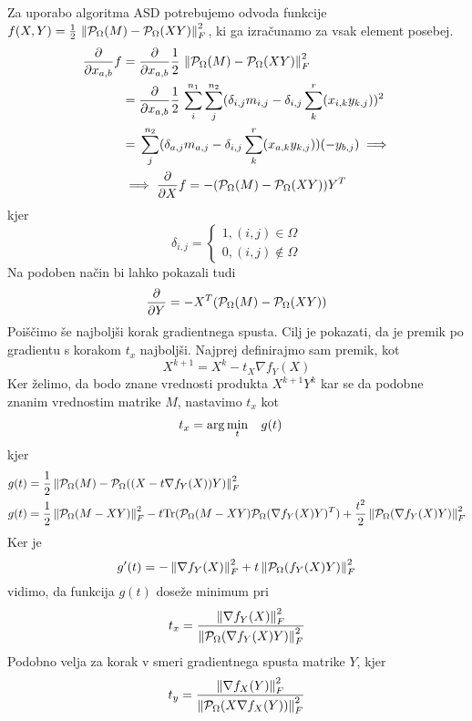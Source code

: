 Za uporabo algoritma ASD potrebujemo odvoda funkcije $f(X,Y) = \frac{1}{2}\, \left\lVert\mathcal{P}_\Omega(M) - \mathcal{P}_\Omega(XY)\right\rVert_F^2$, ki ga izračunamo za vsak element posebej.
\begin{align*}
    \frac{\partial}{\partial x_{a,b}} f &= \frac{\partial}{\partial x_{a,b}} \frac{1}{2}\, \left\lVert\mathcal{P}_\Omega(M) - \mathcal{P}_\Omega(XY)\right\rVert_F^2  \\
    &= \frac{\partial}{\partial x_{a,b}} \frac{1}{2}\, \sum_{i}^{n_1}\sum_{j}^{n_2}(\delta_{i,j}m_{i,j} - \delta_{i,j}\sum_{k}^{r}(x_{i,k}y_{k,j}))^2  \\
    &= \, \sum_{j}^{n_2}(\delta_{a,j}m_{a,j} - \delta_{i,j}\sum_{k}^{r}(x_{a,k}y_{k,j}))(-y_{b,j}) \implies \\
    &\implies \frac{\partial}{\partial X}f = -(\mathcal{P}_\Omega(M) - \mathcal{P}_\Omega(XY))Y^T
\end{align*}
kjer 
\[
    \delta_{i,j} = \begin{cases}
        1, (i, j) \in \Omega \\
        0, (i, j) \notin \Omega
    \end{cases}
\]
Na podoben način bi lahko pokazali tudi
\[
    \frac{\partial}{\partial Y} = -X^T (\mathcal{P}_\Omega(M) - \mathcal{P}_\Omega(XY))
\]
Poiščimo še najboljši korak gradientnega spusta.
Cilj je pokazati, da je premik po gradientu s korakom $t_x$ najboljši.
Najprej definirajmo sam premik, kot
\[
    X^{k+1} = X^k - t_X \nabla f_Y(X)
\]
Ker želimo, da bodo znane vrednosti produkta $X^{k+1}Y^{k}$ kar se da podobne znanim vrednostim matrike $M$, nastavimo $t_x$ kot 
\begin{align*}
    t_x &= \arg \min_t \hspace{0.3cm} g(t)
\end{align*} kjer
\begin{align*}
    g(t) &= \frac{1}{2} \left\lVert\mathcal{P}_\Omega(M) - \mathcal{P}_\Omega((X - t\nabla f_Y(X))Y)\right\rVert_F^2 \\
    g(t) &= \frac{1}{2} \left\lVert\mathcal{P}_\Omega(M - XY)\right\rVert_F^2 - t\text{Tr}(\mathcal{P}_\Omega(M - XY)\mathcal{P}_\Omega(\nabla f_Y(X)Y)^T) + \frac{t^2}{2}\left\lVert\mathcal{P}_\Omega(\nabla f_Y(X)Y)\right\rVert_F^2
\end{align*}
Ker je \cite{AST-TK15} 
\[
  g'(t) = -\left\lVert\nabla f_Y(X)\right\rVert_F^2 + t\left\lVert\mathcal{P}_\Omega(f_Y(X)Y)\right\rVert_F^2 
\]
vidimo, da funkcija $g(t)$ doseže minimum pri 
\[
  t_x = \frac{\left\lVert\nabla f_Y(X)\right\rVert_F^2}{\left\lVert\mathcal{P}_\Omega(\nabla f_Y(X)Y)\right\rVert_F^2}  
\]
Podobno velja za korak v smeri gradientnega spusta matrike $Y$, kjer
\[
  t_y = \frac{\left\lVert\nabla f_X(Y)\right\rVert_F^2}{\left\lVert\mathcal{P}_\Omega(X \nabla f_X(Y))\right\rVert_F^2}  
\]